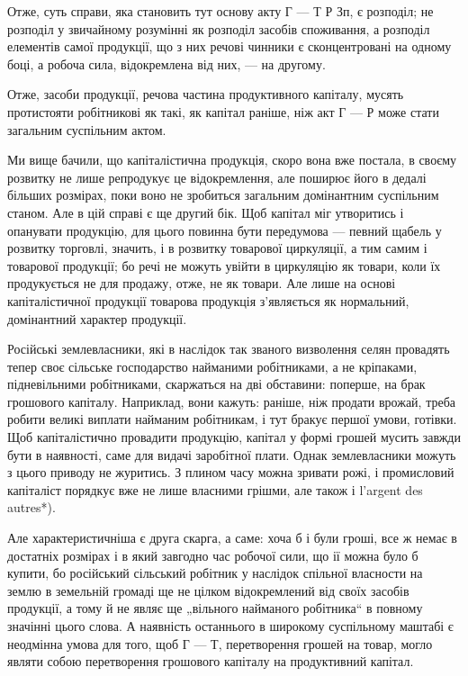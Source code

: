 Отже, суть справи, яка становить тут основу акту Г — Т Р Зп, є
розподіл; не розподіл у звичайному розумінні як розподіл засобів споживання,
а розподіл елементів самої продукції, що з них речові чинники
є сконцентровані на одному боці, а робоча сила, відокремлена від них, —
на другому.

Отже, засоби продукції, речова частина продуктивного капіталу,
мусять протистояти робітникові як такі, як капітал раніше, ніж акт Г — Р
може стати загальним суспільним актом.

Ми вище бачили, що капіталістична продукція, скоро вона вже постала,
в своєму розвитку не лише репродукує це відокремлення, але поширює
його в дедалі більших розмірах, поки воно не зробиться загальним домінантним
суспільним станом. Але в цій справі є ще другий бік. Щоб
капітал міг утворитись і опанувати продукцію, для цього повинна бути
передумова — певний щабель у розвитку торговлі, значить, і в розвитку
товарової циркуляції, а тим самим і товарової продукції; бо речі не
можуть увійти в циркуляцію як товари, коли їх продукується не для
продажу, отже, не як товари. Але лише на основі капіталістичної продукції
товарова продукція з’являється як нормальний, домінантний характер
продукції.

Російські землевласники, які в наслідок так званого визволення селян
провадять тепер своє сільське господарство найманими робітниками, а
не кріпаками, підневільними робітниками, скаржаться на дві обставини:
поперше, на брак грошового капіталу. Наприклад, вони кажуть: раніше,
ніж продати врожай, треба робити великі виплати найманим робітникам,
і тут бракує першої умови, готівки. Щоб капіталістично провадити
продукцію, капітал у формі грошей мусить завжди бути в наявності, саме
для видачі заробітної плати. Однак землевласники можуть з цього приводу
не журитись. З плином часу можна зривати рожі, і промисловий капіталіст
порядкує вже не лише власними грішми, але також і l’argent des autres*).

Але характеристичніша є друга скарга, а саме: хоча б і були
гроші, все ж немає в достатніх розмірах і в який завгодно час робочої
сили, що ії можна було б купити, бо російський сільський
робітник у наслідок спільної власности на землю в земельній громаді ще
не цілком відокремлений від своїх засобів продукції, а тому й не являє
ще „вільного найманого робітника“ в повному значінні цього слова.
А наявність останнього в широкому суспільному маштабі є неодмінна
умова для того, щоб Г — Т, перетворення грошей на товар, могло являти
собою перетворення грошового капіталу на продуктивний капітал.


